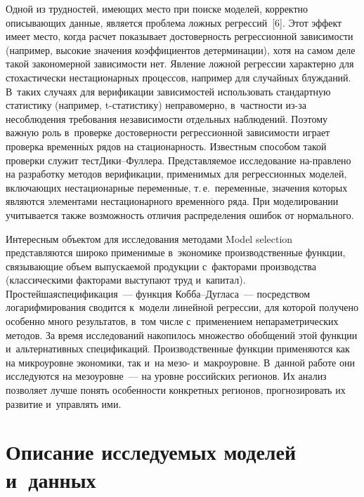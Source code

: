\begin{multicols}{2}
  Одной из трудностей, имеющих место при поиске моделей, корректно описывающих 
данные, является проблема ложных регрессий~[6]. Этот эффект имеет место, когда 
расчет показывает достоверность регрессионной зависимости (например, высокие 
значения коэффициентов детерминации), хотя на самом деле такой закономерной 
зависимости нет. Явление ложной регрессии характерно для стохастически 
нестационарных процессов, например для случайных блужданий. В~таких\linebreak
 случаях для 
верификации зависимостей использовать стандартную статистику (например, 
t-ста\-ти\-сти\-ку) неправомерно, в~част\-ности из-за несоблюдения требования независимости 
отдельных \mbox{наблюдений}. Поэтому важ\-ную роль в~проверке достоверности регрессионной 
зависимости играет проверка временн$\acute{\mbox{ы}}$х рядов на стационарность. Известным способом 
такой проверки служит тест\linebreak Ди\-ки--Фул\-ле\-ра. Представляемое 
исследование на-\linebreak правлено 
на разработку методов верификации, применимых для регрессионных моделей, 
вклю\-чающих нестационарные переменные, т.\,е.\ переменные, значения которых 
являются элементами нестационарного временн$\acute{\mbox{о}}$го ряда. При моделировании 
учитывается также возможность отличия распределения ошибок от нормального.
   
    Интересным объектом для исследования методами Model selection пред\-став\-ля\-ют\-ся 
широко применимые в~экономике производственные функции, связывающие объем 
выпускаемой продукции с~факторами производства (классическими факторами 
выступают труд и~капитал). Простейшая\linebreak спецификация~--- функция Коб\-ба--Дуг\-ла\-са~--- 
посредством логарифмирования сводится к~модели линейной регрессии, для которой 
получено особенно много результатов, в~том чис\-ле с~применением непараметрических 
методов. За время исследований накопилось множество обобщений этой функции 
и~альтернативных спецификаций. Производственные функции применяются как на 
микроуровне экономики, так и~на мезо- и~макроуровне. В~данной работе они 
исследуются на мезоуровне~--- на уровне российских регионов. Их анализ позволяет 
лучше понять особенности конкретных регионов, прогнозировать их развитие 
и~управлять ими.
{ %

}

\section{Описание исследуемых моделей и~данных}


\end{multicols}
